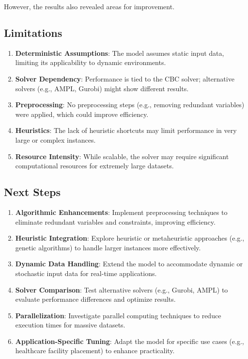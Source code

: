 \documentclass[11pt,letterpaper]{article}
\begin{document}
However, the results also revealed areas for improvement.

\subsection*{Limitations}
\begin{enumerate}
    \item \textbf{Deterministic Assumptions}: The model assumes static input data, limiting its applicability to dynamic environments.
    \item \textbf{Solver Dependency}: Performance is tied to the CBC solver; alternative solvers (e.g., AMPL, Gurobi) might show different results.
    \item \textbf{Preprocessing}: No preprocessing steps (e.g., removing redundant variables) were applied, which could improve efficiency.
    \item \textbf{Heuristics}: The lack of heuristic shortcuts may limit performance in very large or complex instances.
    \item \textbf{Resource Intensity}: While scalable, the solver may require significant computational resources for extremely large datasets.
\end{enumerate}

\subsection*{Next Steps}
\begin{enumerate}
    \item \textbf{Algorithmic Enhancements}: Implement preprocessing techniques to eliminate redundant variables and constraints, improving efficiency.
    \item \textbf{Heuristic Integration}: Explore heuristic or metaheuristic approaches (e.g., genetic algorithms) to handle larger instances more effectively.
    \item \textbf{Dynamic Data Handling}: Extend the model to accommodate dynamic or stochastic input data for real-time applications.
    \item \textbf{Solver Comparison}: Test alternative solvers (e.g., Gurobi, AMPL) to evaluate performance differences and optimize results.
    \item \textbf{Parallelization}: Investigate parallel computing techniques to reduce execution times for massive datasets.
    \item \textbf{Application-Specific Tuning}: Adapt the model for specific use cases (e.g., healthcare facility placement) to enhance practicality.
\end{enumerate}
\end{document}
